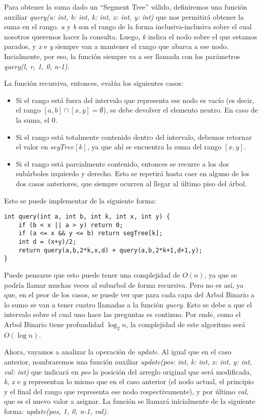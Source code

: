 \documentclass{article}
\begin{document}
Para obtener la suma dado un ``Segment Tree'' válido, definiremos una función auxiliar \textit{query(a: int, b: int, k: int, x: int, y: int)} que nos permitirá obtener la suma en el rango. \textit{a} y \textit{b} son el rango de la forma inclusiva-inclusiva sobre el cual nosotros queremos hacer la consulta. Luego, \textit{k} indica el nodo sobre el que estamos parados, y \textit{x} e \textit{y} siempre van a mantener el rango que abarca a ese nodo. Incialmente, por eso, la función siempre va a ser llamada con los parámetros \textit{query(l, r, 1, 0, n-1)}.

La función recursiva, entonces, evalúa los siguientes casos:
\begin{itemize}
    \item Si el rango está fuera del intervalo que representa ese nodo es vacío (es decir, el rango $[a,b]\cap[x,y] = \emptyset$), se debe devolver el elemento neutro. En caso de la suma, el $0$.
    \item Si el rango está totalmente contenido dentro del intervalo, debemos retornar el valor en $segTree[k]$, ya que ahí se encuentra la suma del rango $[x,y]$.
    \item Si el rango está parcialmente contenido, entonces se recurre a los dos subárboles izquierdo y derecho. Esto se repetirá hasta caer en alguno de los dos casos anteriores, que siempre ocurren al llegar al último piso del árbol.
\end{itemize}

Esto se puede implementar de la siguiente forma:

\begin{verbatim}
int query(int a, int b, int k, int x, int y) {
    if (b < x || a > y) return 0;
    if (a <= x && y <= b) return segTree[k];
    int d = (x+y)/2;
    return query(a,b,2*k,x,d) + query(a,b,2*k+1,d+1,y);
}
\end{verbatim}

Puede pensarse que esto puede tener una complejidad de $O(n)$, ya que se podría llamar muchas veces al subarbol de forma recursiva. Pero no es así, ya que, en el peor de los casos, se puede ver que para cada capa del Arbol Binario a lo sumo se van a tener cuatro llamadas a la función \textit{query}. Esto se debe a que el intervalo sobre el cual uno hace las preguntas es continuo. Por ende, como el Arbol Binario tiene profundidad $\log_2 n$, la complejidad de este algoritmo será $O(\log n)$.

Ahora, vayamos a analizar la operación de \textit{update}. Al igual que en el caso anterior, nombraremos una función auxiliar \textit{update(pos: int, k: int, x: int, y: int, val: int)} que indicará en \textit{pos} la posición del arreglo original que será modificada, \textit{k}, \textit{x} e \textit{y} representan lo mismo que en el caso anterior (el nodo actual, el principio y el final del rango que representa ese nodo respectivamente), y por último \textit{val}, que es el nuevo valor a asignar. La función se llamará inicialmente de la siguiente forma: \textit{update(pos, 1, 0, n-1, val)}.
\end{document}

